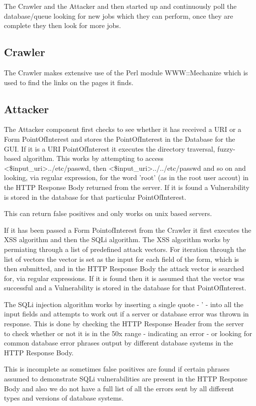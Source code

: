 \documentclass[12pt,a4paper]{article}
\begin{document}
The Crawler and the Attacker and then started up and continuously poll the database/queue looking for new jobs which they can perform, once they are complete they then look for more jobs.

\subsection{Crawler}
The Crawler makes extensive use of the Perl module WWW::Mechanize which is used to find the links on the pages it finds.

\subsection{Attacker}
The Attacker component first checks to see whether it has received a URI or a Form PointOfInterest and stores the PointOfInterest in the Database for the GUI.  If it is a URI PointOfInterest it executes the directory traversal, fuzzy-based algorithm.  This works by attempting to access <\$input\_uri>../etc/passwd, then <\$input\_uri>../../etc/passwd and so on and looking, via regular expression, for the word 'root' (as in the root user accout) in the HTTP Response Body returned from the server.  If it is found a Vulnerability is stored in the database for that particular PointOfInterest.

This can return false positives and only works on unix based servers.

If it has been passed a Form PointofInterest from the Crawler it first executes the XSS algorithm and then the SQLi algorithm.  The XSS algorithm works by permiating through a list of predefined attack vectors. For iteration through the list of vectors the vector is set as the input for each field of the form, which is then submitted, and in the HTTP Response Body the attack vector is searched for, via regular expressions.  If it is found then it is assumed that the vector was successful and a Vulnerability is stored in the database for that PointOfInterest.

The SQLi injection algorithm works by inserting a single quote - ' - into all the input fields and attempts to work out if a server or database error was thrown in response.  This is done by checking the HTTP Response Header from the server to check whether or not it is in the 50x range - indicating an error - or looking for common database error phrases output by different database systems in the HTTP Response Body.  

This is incomplete as sometimes false positives are found if certain phrases assumed to demonstrate SQLi vulnerabilities are present in the HTTP Response Body and also we do not have a full list of all the errors sent by all different types and versions of database systems.
\end{document}
